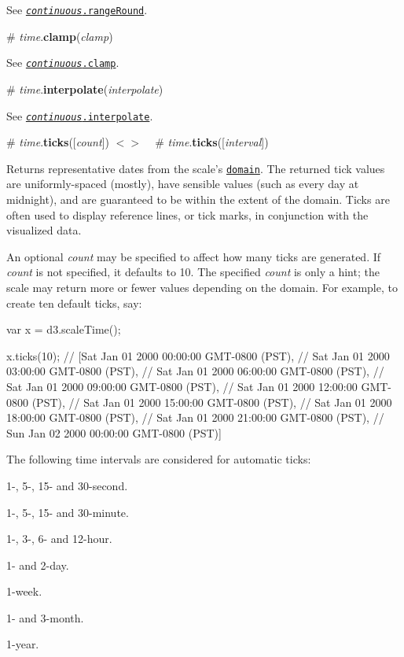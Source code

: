 See \href{#continuous_rangeRound}{\tt {\itshape continuous}.range\+Round}.

\label{_time_clamp}%
\# {\itshape time}.{\bfseries clamp}({\itshape clamp})

See \href{#continuous_clamp}{\tt {\itshape continuous}.clamp}.

\label{_time_interpolate}%
\# {\itshape time}.{\bfseries interpolate}({\itshape interpolate})

See \href{#continuous_interpolate}{\tt {\itshape continuous}.interpolate}.

\label{_time_ticks}%
\# {\itshape time}.{\bfseries ticks}(\mbox{[}{\itshape count}\mbox{]}) \href{https://github.com/d3/d3-scale/blob/master/src/time.js#L103}{\tt $<$$>$} ~\newline
\label{_time_ticks}%
\# {\itshape time}.{\bfseries ticks}(\mbox{[}{\itshape interval}\mbox{]})

Returns representative dates from the scale’s \href{#time_domain}{\tt domain}. The returned tick values are uniformly-\/spaced (mostly), have sensible values (such as every day at midnight), and are guaranteed to be within the extent of the domain. Ticks are often used to display reference lines, or tick marks, in conjunction with the visualized data.

An optional {\itshape count} may be specified to affect how many ticks are generated. If {\itshape count} is not specified, it defaults to 10. The specified {\itshape count} is only a hint; the scale may return more or fewer values depending on the domain. For example, to create ten default ticks, say\+:


\begin{DoxyCode}
var x = d3.scaleTime();

x.ticks(10);
// [Sat Jan 01 2000 00:00:00 GMT-0800 (PST),
//  Sat Jan 01 2000 03:00:00 GMT-0800 (PST),
//  Sat Jan 01 2000 06:00:00 GMT-0800 (PST),
//  Sat Jan 01 2000 09:00:00 GMT-0800 (PST),
//  Sat Jan 01 2000 12:00:00 GMT-0800 (PST),
//  Sat Jan 01 2000 15:00:00 GMT-0800 (PST),
//  Sat Jan 01 2000 18:00:00 GMT-0800 (PST),
//  Sat Jan 01 2000 21:00:00 GMT-0800 (PST),
//  Sun Jan 02 2000 00:00:00 GMT-0800 (PST)]
\end{DoxyCode}


The following time intervals are considered for automatic ticks\+:


\begin{DoxyItemize}
\item 1-\/, 5-\/, 15-\/ and 30-\/second.
\item 1-\/, 5-\/, 15-\/ and 30-\/minute.
\item 1-\/, 3-\/, 6-\/ and 12-\/hour.
\item 1-\/ and 2-\/day.
\item 1-\/week.
\item 1-\/ and 3-\/month.
\item 1-\/year.
\end{DoxyItemize}

